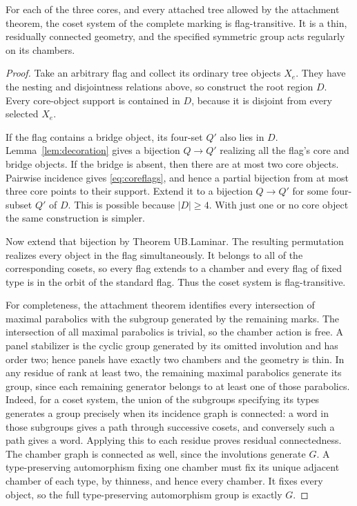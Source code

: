\begin{theorem}\label{thm:flags}
For each of the three cores, and every attached tree allowed by the
attachment theorem, the coset system of the complete marking is
flag-transitive. It is a thin, residually connected geometry, and the
specified symmetric group acts regularly on its chambers.
\end{theorem}
\begin{proof}
Take an arbitrary flag and collect its ordinary tree objects $X_e$.
They have the nesting and disjointness relations above, so construct
the root region $D$. Every core-object support is contained in $D$,
because it is disjoint from every selected $X_e$.

If the flag contains a bridge object, its four-set $Q'$ also lies in
$D$. Lemma~\ref{lem:decoration} gives a bijection $Q\to Q'$ realizing
all the flag's core and bridge objects. If the bridge is absent, then
there are at most two core objects. Pairwise incidence gives \eqref{eq:coreflags}, and
hence a partial bijection from at most three core points to their
support. Extend it to a bijection $Q\to Q'$ for some four-subset
$Q'$ of $D$. This is possible because $|D|\geq4$. With just one or no
core object the same construction is simpler.

Now extend that bijection by Theorem UB.Laminar. The
resulting permutation realizes every object in the flag simultaneously.
It belongs to all of the corresponding cosets, so every flag extends
to a chamber and every flag of fixed type is in the orbit of the
standard flag. Thus the coset system is flag-transitive.

For completeness, the attachment theorem identifies every intersection
of maximal parabolics with the subgroup generated by the remaining
marks. The intersection of all maximal parabolics is trivial, so the
chamber action is free. A panel stabilizer is the cyclic group generated
by its omitted involution and has order two; hence panels have exactly
two chambers and the geometry is thin. In any residue of rank at least
two, the remaining maximal parabolics generate its group, since each
remaining generator belongs to at least one of those parabolics.
Indeed, for a coset system, the union of the subgroups specifying
its types generates a group precisely when its incidence graph is
connected: a word in those subgroups gives a path through successive
cosets, and conversely such a path gives a word. Applying this to each
residue proves residual connectedness. The chamber graph is connected
as well, since the involutions generate $G$. A type-preserving
automorphism fixing one chamber must fix its unique adjacent chamber
of each type, by thinness, and hence every chamber. It fixes every
object, so the full type-preserving automorphism group is exactly $G$.
\end{proof}

